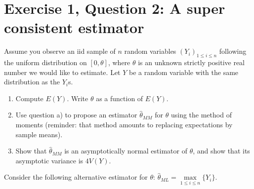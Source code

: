 \documentclass{article}
\begin{document}
\section{Exercise 1, Question 2: A super consistent estimator}

Assume you observe an iid sample of $n$ random variables $(Y_i)_{1 \leq i \leq n}$ following the uniform distribution on $[0, \theta]$, where $\theta$ is an unknown strictly positive real number we would like to estimate. Let $Y$ be a random variable with the same distribution as the $Y_i$s.

\begin{enumerate}[label=(\arabic*), leftmargin=*, align=left]
    \item Compute $E(Y)$. Write $\theta$ as a function of $E(Y)$.
    \item Use question a) to propose an estimator $\hat{\theta}_{MM}$ for $\theta$ using the method of moments (reminder: that method amounts to replacing expectations by sample means).
    \item Show that $\hat{\theta}_{MM}$ is an asymptotically normal estimator of $\theta$, and show that its asymptotic variance is $4V(Y)$.
\end{enumerate}

\noindent Consider the following alternative estimator for $\theta$: $\hat{\theta}_{ML} = \max\limits_{1 \leq i \leq n} \{ Y_i \}$.
\end{document}
